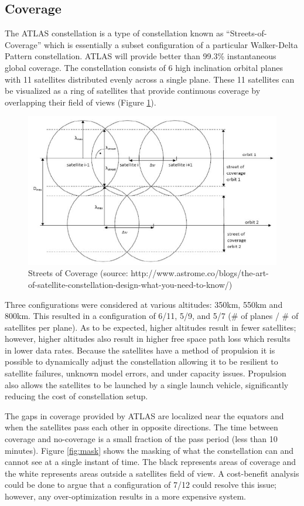 \documentclass{article}
\begin{document}
\subsection{Coverage}
The ATLAS constellation is a type of constellation known as “Streets-of-Coverage” which is essentially a subset configuration of a particular Walker-Delta Pattern constellation. ATLAS will provide better than 99.3\% instantaneous global coverage. The constellation consists of 6 high inclination orbital planes with 11 satellites distributed evenly across a single plane. These 11 satellites can be visualized as a ring of satellites that provide continuous coverage by overlapping their field of views (Figure \ref{fig:coverage}). 
\begin{figure}[H]
  \centering
  \includegraphics[width=0.65\linewidth]{figures/streets_of_coverage}
  \caption{Streets of Coverage (source: http://www.astrome.co/blogs/the-art-of-satellite-constellation-design-what-you-need-to-know/)}
\label{fig:coverage}
\end{figure}

Three configurations were considered at various altitudes: 350km, 550km and 800km. This resulted in a configuration of 6/11, 5/9, and 5/7 (\# of planes / \# of satellites per plane). As to be expected, higher altitudes result in fewer satellites; however, higher altitudes also result in higher free space path loss which results in lower data rates. Because the satellites have a method of propulsion it is possible to dynamically adjust the constellation allowing it to be resilient to satellite failures, unknown model errors, and under capacity issues. Propulsion also allows the satellites to be launched by a single launch vehicle, significantly reducing the cost of constellation setup.

The gaps in coverage provided by ATLAS are localized near the equators and when the satellites pass each other in opposite directions. The time between coverage and no-coverage is a small fraction of the pass period (less than 10 minutes). Figure \ref{fig:mask} shows the masking of what the constellation can and cannot see at a single instant of time. The black represents areas of coverage and the white represents areas outside a satellites field of view. A cost-benefit analysis could be done to argue that a configuration of 7/12 could resolve this issue; however, any over-optimization results in a more expensive system. 
\end{document}
